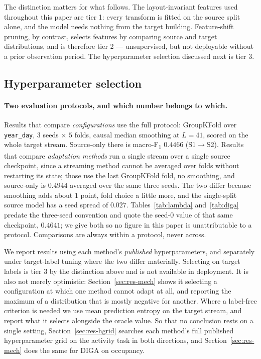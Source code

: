 \documentclass[a4paper,fleqn]{cas-dc}
\newcommand{\macf}{macro-F\textsubscript{1}}
\begin{document}
The distinction matters for what follows. The layout-invariant features used throughout
this paper are tier 1: every transform is fitted on the source split alone, and the model
needs nothing from the target building. Feature-shift pruning, by contrast, selects
features by comparing source and target distributions, and is therefore tier 2 ---
unsupervised, but not deployable without a prior observation period. The hyperparameter
selection discussed next is tier 3.

\subsection{Hyperparameter selection}
\label{sec:method-hparam}

\paragraph{Two evaluation protocols, and which number belongs to which.} Results that
compare \emph{configurations} use the full protocol: GroupKFold over \texttt{year\_day},
$3$ seeds $\times$ $5$ folds, causal median smoothing at $L=41$, scored on the whole target
stream. Source-only there is \macf{} $0.4466$ (S1$\to$S2). Results that compare
\emph{adaptation methods} run a single stream over a single source checkpoint, since a
streaming method cannot be averaged over folds without restarting its state; those use the
last GroupKFold fold, no smoothing, and source-only is $0.4944$ averaged over the same
three seeds. The two differ because smoothing adds about $1$ point, fold choice a little
more, and the single-split source model has a seed spread of $0.027$. Tables~\ref{tab:lambda}
and~\ref{tab:diga} predate the three-seed convention and quote the seed-$0$ value of that
same checkpoint, $0.4641$; we give both so no figure in this paper is unattributable to a
protocol. Comparisons are always within a protocol, never across.

We report results using each method's \emph{published} hyperparameters, and separately
under target-label tuning where the two differ materially. Selecting on target labels is
tier 3 by the distinction above and is not available in deployment. It is also not merely
optimistic: Section~\ref{sec:res-mech} shows it selecting a configuration at which one
method cannot adapt at all, and reporting the maximum of a distribution that is mostly
negative for another. Where a label-free criterion is needed we use mean prediction
entropy on the target stream, and report what it selects alongside the oracle value. So
that no conclusion rests on a single setting, Section~\ref{sec:res-hgrid} searches each
method's full published hyperparameter grid on the activity task in both directions, and
Section~\ref{sec:res-mech} does the same for DIGA on occupancy.
\end{document}
